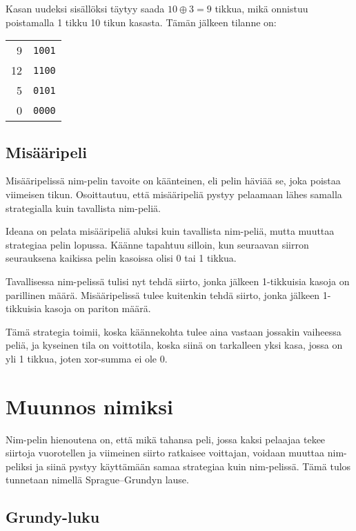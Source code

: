 Kasan uudeksi sisällöksi täytyy saada
$10 \oplus 3 = 9$ tikkua,
mikä onnistuu poistamalla 1 tikku
10 tikun kasasta.
Tämän jälkeen tilanne on:

\begin{center}
\begin{tabular}{r|r}
9 & \texttt{1001} \\
12 & \texttt{1100} \\
5 & \texttt{0101} \\
\hline
0 & \texttt{0000} \\
\end{tabular}
\end{center}

\subsection{Misääripeli}

Misääripelissä nim-pelin tavoite on käänteinen,
eli pelin häviää se, joka poistaa viimeisen tikun.
Osoittautuu, että misääripeliä pystyy pelaamaan lähes samalla
strategialla kuin tavallista nim-peliä.

Ideana on pelata misääripeliä aluksi kuin tavallista
nim-peliä, mutta muuttaa strategiaa pelin
lopussa. Käänne tapahtuu silloin, kun seuraavan
siirron seurauksena kaikissa pelin kasoissa olisi 0 tai 1 tikkua.

Tavallisessa nim-pelissä tulisi nyt tehdä siirto,
jonka jälkeen 1-tikkuisia kasoja on parillinen määrä.
Misääripelissä tulee kuitenkin tehdä siirto,
jonka jälkeen 1-tikkuisia kasoja on pariton määrä.

Tämä strategia toimii, koska käännekohta tulee aina
vastaan jossakin vaiheessa peliä,
ja kyseinen tila on voittotila,
koska siinä on tarkalleen yksi kasa,
jossa on yli 1 tikkua,
joten xor-summa ei ole 0.

\section{Muunnos nimiksi}

Nim-pelin hienoutena on, että mikä tahansa peli,
jossa kaksi pelaajaa tekee siirtoja vuorotellen
ja viimeinen siirto ratkaisee voittajan,
voidaan muuttaa nim-peliksi
ja siinä pystyy käyttämään samaa strategiaa kuin nim-pelissä.
Tämä tulos tunnetaan nimellä Sprague–Grundyn lause.

\subsection{Grundy-luku}

